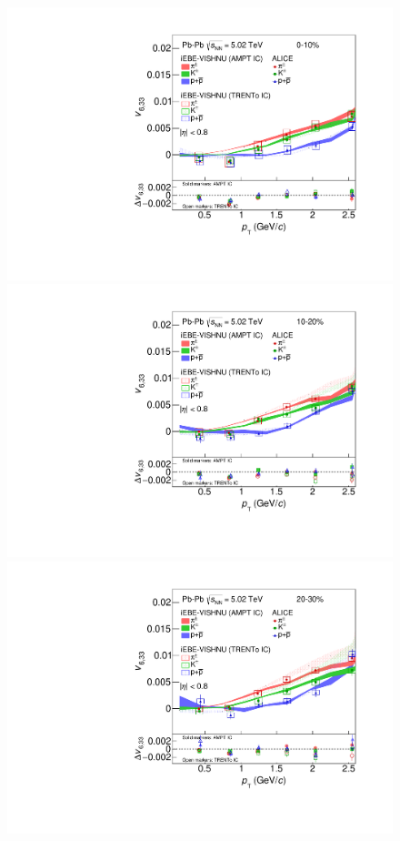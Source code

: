 \begin{figure}[!htb]
\begin{center}
\includegraphics[scale=0.26]{figures/model/TrentoAndAMPT_v633_gap00_new_0-10_PID2.pdf}
\includegraphics[scale=0.26]{figures/model/TrentoAndAMPT_v633_gap00_new_10-20_PID2.pdf}
\includegraphics[scale=0.26]{figures/model/TrentoAndAMPT_v633_gap00_new_20-30_PID2.pdf}

\end{center}
\end{figure}

